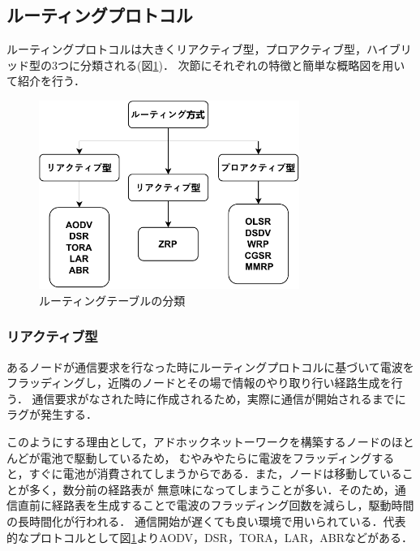\documentclass[a4paper, 11pt]{ltjsarticle}
\begin{document}

\subsection{ルーティングプロトコル}
ルーティングプロトコルは大きくリアクティブ型，プロアクティブ型，ハイブリッド型の3つに分類される(図\ref{routing_classification})．
次節にそれぞれの特徴と簡単な概略図を用いて紹介を行う．
\begin{figure}[H]
  \centering
  \includegraphics[width=85mm]{classification_of_routing.pdf}
  \caption{ルーティングテーブルの分類}
  \label{routing_classification}
\end{figure}

\subsubsection{リアクティブ型}
あるノードが通信要求を行なった時にルーティングプロトコルに基づいて電波をフラッディングし，近隣のノードとその場で情報のやり取り行い経路生成を行う．
通信要求がなされた時に作成されるため，実際に通信が開始されるまでにラグが発生する．

このようにする理由として，アドホックネットーワークを構築するノードのほとんどが電池で駆動しているため，
むやみやたらに電波をフラッディングすると，すぐに電池が消費されてしまうからである．また，ノードは移動していることが多く，数分前の経路表が
無意味になってしまうことが多い．そのため，通信直前に経路表を生成することで電波のフラッディング回数を減らし，駆動時間の長時間化が行われる．
通信開始が遅くても良い環境で用いられている．代表的なプロトコルとして図\ref{routing_classification}よりAODV，DSR，TORA，LAR，ABRなどがある．
\end{document}
